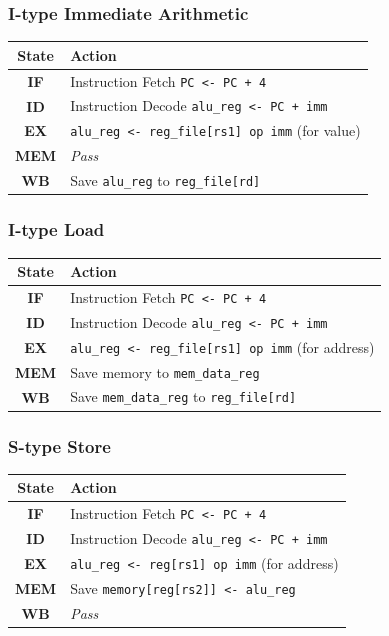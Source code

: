 \documentclass{scrartcl}
\begin{document}
\subsubsection{I-type Immediate Arithmetic}
\begin{tabularx}{\textwidth}{ | c | X | }
  \hline
  \textbf{State} & \textbf{Action} \\ \hline
  \textbf{IF} & Instruction Fetch \newline \texttt{PC <- PC + 4} \\ \hline
  \textbf{ID} & Instruction Decode \newline \texttt{alu\_reg <- PC + imm} \\ \hline
  \textbf{EX} & \texttt{alu\_reg <- reg\_file[rs1] op imm} (for value) \\ \hline
  \textbf{MEM} & \textit{Pass} \\ \hline
  \textbf{WB} & Save \texttt{alu\_reg} to \texttt{reg\_file[rd]} \\
  \hline
\end{tabularx}

\subsubsection{I-type Load}
\begin{tabularx}{\textwidth}{ | c | X | }
  \hline
  \textbf{State} & \textbf{Action} \\ \hline
  \textbf{IF} & Instruction Fetch \newline \texttt{PC <- PC + 4} \\ \hline
  \textbf{ID} & Instruction Decode \newline \texttt{alu\_reg <- PC + imm} \\ \hline
  \textbf{EX} & \texttt{alu\_reg <- reg\_file[rs1] op imm} (for address) \\ \hline
  \textbf{MEM} & Save memory to \texttt{mem\_data\_reg} \\ \hline
  \textbf{WB} & Save \texttt{mem\_data\_reg} to \texttt{reg\_file[rd]} \\
  \hline
\end{tabularx}

\subsubsection{S-type Store}
\begin{tabularx}{\textwidth}{ | c | X | }
  \hline
  \textbf{State} & \textbf{Action} \\ \hline
  \textbf{IF} & Instruction Fetch \newline \texttt{PC <- PC + 4} \\ \hline
  \textbf{ID} & Instruction Decode \newline \texttt{alu\_reg <- PC + imm} \\ \hline
  \textbf{EX} & \texttt{alu\_reg <- reg[rs1] op imm} (for address) \\ \hline
  \textbf{MEM} & Save \texttt{memory[reg[rs2]] <- alu\_reg} \\ \hline
  \textbf{WB} & \textit{Pass} \\
  \hline
\end{tabularx}
\end{document}
